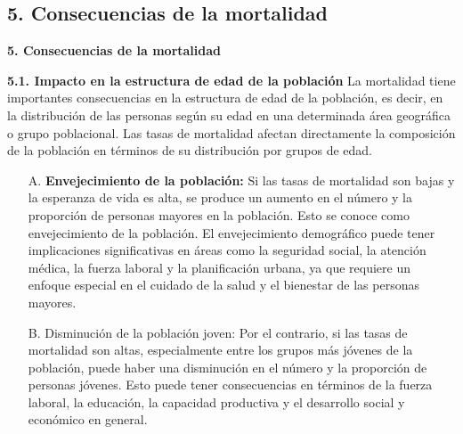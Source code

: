 \documentclass[8pt,a4paper]{beamer}
\begin{document}
{\subsection{5. Consecuencias de la mortalidad}
\begin{frame}{\textbf{5. Consecuencias de la mortalidad}}
\setlength{\parskip}{3px}
\justifying
\begin{block}{\textbf{5.1. Impacto en la estructura de edad de la población}}
\setlength{\parskip}{3px}
\justifying
La mortalidad tiene importantes consecuencias en la estructura de edad de la población, es decir, en la distribución de las personas según su edad en una determinada área geográfica o grupo poblacional. Las tasas de mortalidad afectan directamente la composición de la población en términos de su distribución por grupos de edad.

\begin{enumerate}
\setlength{\parskip}{3px}
\justifying
\item[A.] \textbf{Envejecimiento de la población:} Si las tasas de mortalidad son bajas y la esperanza de vida es alta, se produce un aumento en el número y la proporción de personas mayores en la población. Esto se conoce como envejecimiento de la población. El envejecimiento demográfico puede tener implicaciones significativas en áreas como la seguridad social, la atención médica, la fuerza laboral y la planificación urbana, ya que requiere un enfoque especial en el cuidado de la salud y el bienestar de las personas mayores.

\item[B.] Disminución de la población joven: Por el contrario, si las tasas de mortalidad son altas, especialmente entre los grupos más jóvenes de la población, puede haber una disminución en el número y la proporción de personas jóvenes. Esto puede tener consecuencias en términos de la fuerza laboral, la educación, la capacidad productiva y el desarrollo social y económico en general.
\end{enumerate}
\end{block}
\end{frame}

}
\end{document}
